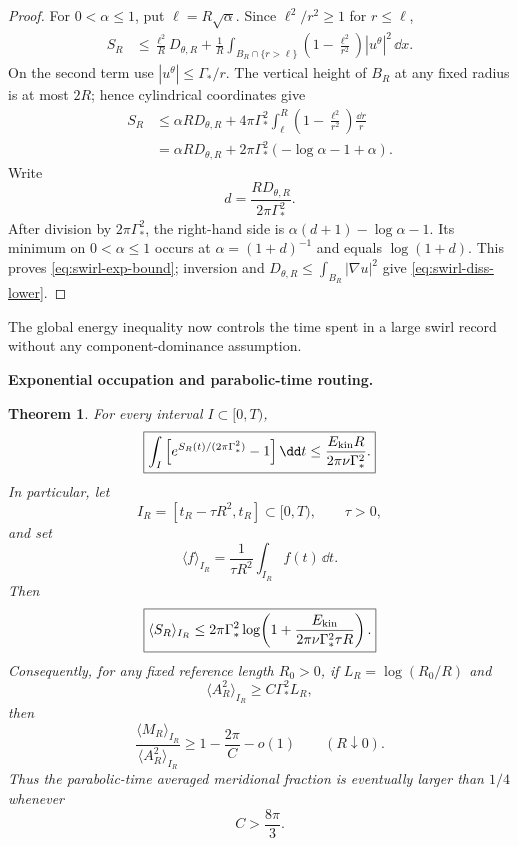 \documentclass[11pt]{article}
\newtheorem{theorem}{Theorem}[section]
\theoremstyle{definition}\newtheorem{definition}[theorem]{Definition}
\theoremstyle{remark}\newtheorem{remark}[theorem]{Remark}
\begin{document}
\begin{proof}
For \(0<\alpha\le1\), put \(\ell=R\sqrt\alpha\).  Since
\(\ell^2/r^2\ge1\) for \(r\le\ell\),
\[
 \begin{aligned}
 S_R
 &\le
 \frac{\ell^2}{R}D_{\theta,R}
 +\frac1R
 \int_{B_R\cap\{r>\ell\}}
 \left(1-\frac{\ell^2}{r^2}\right)|u^\theta|^2\,\dd x.
 \end{aligned}
\]
On the second term use \(|u^\theta|\le\Gamma_*/r\).  The vertical height of
\(B_R\) at any fixed radius is at most \(2R\); hence cylindrical coordinates
give
\[
 \begin{aligned}
 S_R
 &\le
 \alpha R D_{\theta,R}
 +4\pi\Gamma_*^2
 \int_\ell^R
 \left(1-\frac{\ell^2}{r^2}\right)\frac{\dd r}{r}\\
 &=
 \alpha R D_{\theta,R}
 +2\pi\Gamma_*^2(-\log\alpha-1+\alpha).
 \end{aligned}
\]
Write
\[
 d=\frac{R D_{\theta,R}}{2\pi\Gamma_*^2}.
\]
After division by \(2\pi\Gamma_*^2\), the right-hand side is
\(\alpha(d+1)-\log\alpha-1\).  Its minimum on \(0<\alpha\le1\) occurs at
\(\alpha=(1+d)^{-1}\) and equals \(\log(1+d)\).  This proves
\eqref{eq:swirl-exp-bound}; inversion and
\(D_{\theta,R}\le\int_{B_R}|\nabla u|^2\) give \eqref{eq:swirl-diss-lower}.
\end{proof}

The global energy inequality now controls the time spent in a large swirl
record without any component-dominance assumption.

\medskip
\noindent\textbf{Exponential occupation and parabolic-time routing.}
\begin{theorem}\label{thm:parabolic-swirl-routing}
For every interval \(I\subset[0,T)\),
\begin{equation}\label{eq:swirl-occupation}
 \boxed{
 \int_I
 \left[
 e^{S_R(t)/(2\pi\Gamma_*^2)}-1
 \right]\dd t
 \le
 \frac{E_{\rm kin}R}{2\pi\nu\Gamma_*^2}.
 }
\end{equation}
In particular, let
\[
 I_R=[t_R-\tau R^2,t_R]\subset[0,T),
 \qquad \tau>0,
\]
and set
\[
 \langle f\rangle_{I_R}
 =\frac1{\tau R^2}\int_{I_R}f(t)\,\dd t.
\]
Then
\begin{equation}\label{eq:swirl-parabolic-average}
 \boxed{
 \langle S_R\rangle_{I_R}
 \le
 2\pi\Gamma_*^2
 \log\!\left(
 1+\frac{E_{\rm kin}}
 {2\pi\nu\Gamma_*^2\tau R}
 \right).
 }
\end{equation}
Consequently, for any fixed reference length \(R_0>0\), if
\(L_R=\log(R_0/R)\) and
\[
 \langle A_R^2\rangle_{I_R}
 \ge C\Gamma_*^2L_R,
\]
then
\begin{equation}\label{eq:meridional-average-fraction}
 \frac{\langle M_R\rangle_{I_R}}
      {\langle A_R^2\rangle_{I_R}}
 \ge
 1-\frac{2\pi}{C}-o(1)
 \qquad(R\downarrow0).
\end{equation}
Thus the parabolic-time averaged meridional fraction is eventually larger
than \(1/4\) whenever
\[
 \boxed{C>\frac{8\pi}{3}.}
\]
\end{theorem}
\end{document}

